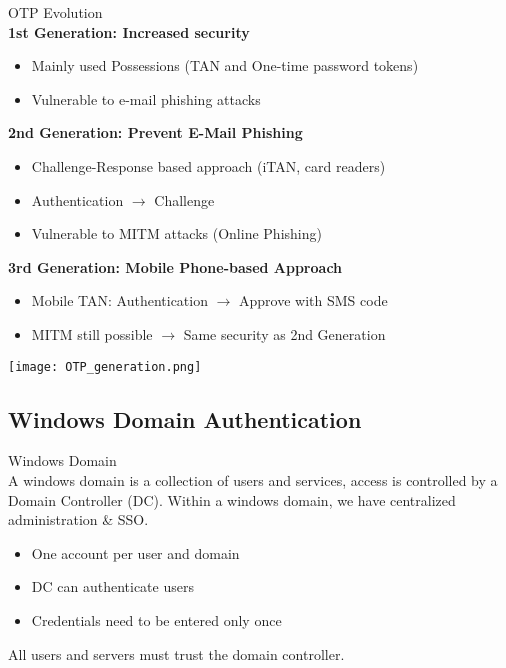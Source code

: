 \begin{concept}{OTP Evolution}\\
    \textbf{1st Generation: Increased security}
    \begin{itemize}
        \item Mainly used Possessions (TAN and One-time password tokens)
        \item Vulnerable to e-mail phishing attacks
    \end{itemize}
    
    \textbf{2nd Generation: Prevent E-Mail Phishing}
    \begin{itemize}
        \item Challenge-Response based approach (iTAN, card readers)
        \item Authentication $\rightarrow$ Challenge
        \item Vulnerable to MITM attacks (Online Phishing)
    \end{itemize}
    
    \textbf{3rd Generation: Mobile Phone-based Approach}
    \begin{itemize}
        \item Mobile TAN: Authentication $\rightarrow$ Approve with SMS code
        \item MITM still possible $\rightarrow$ Same security as 2nd Generation
    \end{itemize}
\end{concept}

\texttt{[image: OTP\_generation.png]}

\subsection{Windows Domain Authentication}

\begin{definition}{Windows Domain}\\
    A windows domain is a collection of users and services, access is controlled by a Domain Controller (DC). Within a windows domain, we have centralized administration \& SSO.
    \begin{itemize}
        \item One account per user and domain
        \item DC can authenticate users
        \item Credentials need to be entered only once
    \end{itemize}
    
    All users and servers must trust the domain controller.
\end{definition}

